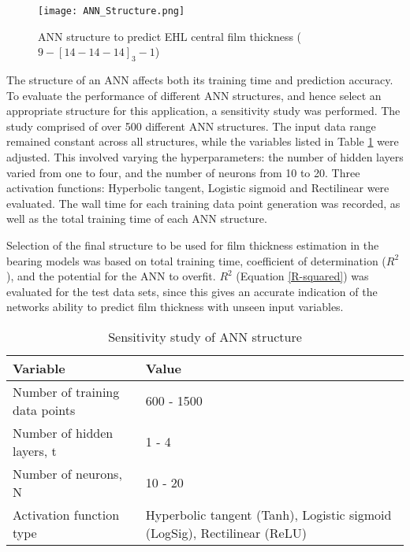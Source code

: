 \begin{figure}
	\centering  
	\texttt{[image: ANN\_Structure.png]}
	\caption{ANN structure to predict EHL central film thickness ($9-[14-14-14]_3-1$)}
	\label{ANN structure}
\end{figure} 

The structure of an ANN affects both its training time and prediction accuracy. To evaluate the performance of different ANN structures, and hence select an appropriate structure for this application, a sensitivity study was performed. The study comprised of over 500 different ANN structures. The input data range remained constant across all structures, while the variables listed in Table \ref{Sensitivity study of ANN structure} were adjusted. This involved varying the hyperparameters: the number of hidden layers varied from one to four, and the number of neurons from 10 to 20. Three activation functions: Hyperbolic tangent, Logistic sigmoid and Rectilinear were evaluated. The wall time for each training data point generation was recorded, as well as the total training time of each ANN structure.

Selection of the final structure to be used for film thickness estimation in the bearing models was based on total training time, coefficient of determination ($R^2$), and the potential for the ANN to overfit. $R^2$ (Equation \ref{R-squared}) was evaluated for the test data sets, since this gives an accurate indication of the networks ability to predict film thickness with unseen input variables.

\begin{table*}
	\caption{Sensitivity study of ANN structure}
	\label{Sensitivity study of ANN structure}
	\centering
	\renewcommand{\arraystretch}{1.5}%
	\begin{tabular}{|P{0.4\textwidth}|P{0.4\textwidth}|}
		\hline
		\textbf{Variable} & \textbf{Value} \\ [0.5ex]
		\hline
		Number of training data points & 600 - 1500 \\ [0.5ex]
		\hline
		Number of hidden layers, t & 1 - 4 \\ [0.5ex]
		\hline
		Number of neurons, N & 10 - 20 \\ [0.5ex]
	    \hline
		Activation function type & Hyperbolic tangent (Tanh), Logistic sigmoid (LogSig), Rectilinear (ReLU) \\ [0.5ex]
		\hline
	\end{tabular}
\end{table*}

